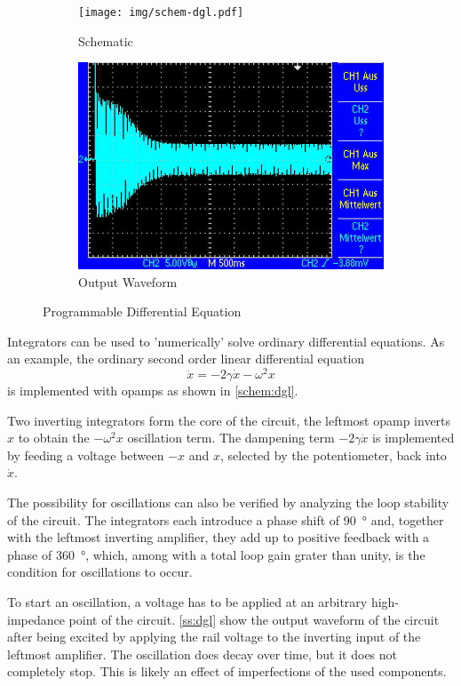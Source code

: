 \begin{figure}
	\centering
	\begin{subfigure}{0.49\textwidth}
		\centering
		\texttt{[image: img/schem-dgl.pdf]}
		\caption{Schematic}
		\label{schem:dgl}
	\end{subfigure}
	\begin{subfigure}{0.4\textwidth}
		\centering
		\includegraphics[width=.9\linewidth]{./img/ss-dgl.jpg}
		\caption{Output Waveform}
		\label{ss:dgl}
	\end{subfigure}
	\caption{Programmable Differential Equation}
\end{figure}

Integrators can be used to 'numerically' solve ordinary differential equations.
As an example, the ordinary second order linear differential equation \[\ddot{x} = - 2 \gamma \dot{x} - \omega^2 x\] is implemented with opamps as shown in \autoref{schem:dgl}.

Two inverting integrators form the core of the circuit, the leftmost opamp inverts $x$ to obtain the $-\omega^2 x$ oscillation term.
The dampening term $-2\gamma\dot{x}$ is implemented by feeding a voltage between $-x$ and $x$, selected by the potentiometer, back into $\dot{x}$.

The possibility for oscillations can also be verified by analyzing the loop stability of the circuit.
The integrators each introduce a phase shift of \SI{90}{\degree} and, together with the leftmost inverting amplifier, they add up to positive feedback with a phase of \SI{360}{\degree}, which, among with a total loop gain grater than unity, is the condition for oscillations to occur.%

To start an oscillation, a voltage has to be applied at an arbitrary high-impedance point of the circuit.
\autoref{ss:dgl} show the output waveform of the circuit after being excited by applying the rail voltage to the inverting input of the leftmost amplifier.
The oscillation does decay over time, but it does not completely stop.
This is likely an effect of imperfections of the used components.
